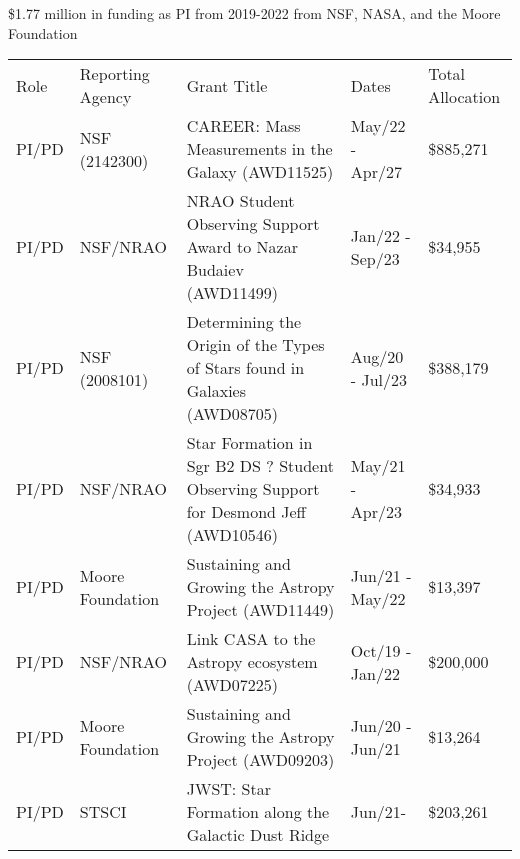 \$1.77 million in funding as PI from 2019-2022 from NSF, NASA, and the Moore Foundation 
\begin{tabular}{lp{1.0in}p{2.5in}p{0.6in}p{0.6in}}
Role & Reporting Agency & Grant Title & Dates & Total \mbox{Allocation}  \\
PI/PD & NSF (2142300) & CAREER: Mass Measurements in the Galaxy (AWD11525) & May/22 - Apr/27 & \$885,271  \\
PI/PD & NSF/NRAO & NRAO Student Observing Support Award to Nazar Budaiev (AWD11499) & Jan/22 - Sep/23 & \$34,955  \\
PI/PD & NSF (2008101) & Determining the Origin of the Types of Stars found in Galaxies (AWD08705) & Aug/20 - Jul/23 & \$388,179  \\
PI/PD & NSF/NRAO & Star Formation in Sgr B2 DS ? Student Observing Support for Desmond Jeff (AWD10546) & May/21 - Apr/23 & \$34,933   \\
PI/PD & Moore Foundation & Sustaining and Growing the Astropy Project (AWD11449) & Jun/21 - May/22 & \$13,397   \\
PI/PD & NSF/NRAO & Link CASA to the Astropy ecosystem (AWD07225) & Oct/19 - Jan/22 & \$200,000   \\
PI/PD & Moore Foundation & Sustaining and Growing the Astropy Project (AWD09203) & Jun/20 - Jun/21 & \$13,264   \\
PI/PD & STSCI & JWST: Star Formation along the Galactic Dust Ridge & Jun/21- &  \$203,261 \\
\end{tabular}
